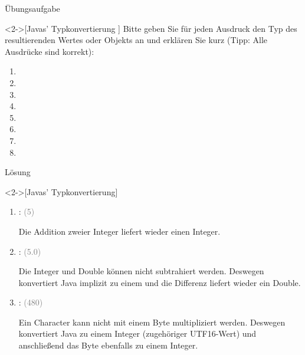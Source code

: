 \begin{frame}[c]{Übungsaufgabe}
    \begin{exercise}<2->[Javas' Typkonvertierung ]
        \pause{}\pause{}Bitte geben Sie für jeden Ausdruck den Typ des resultierenden Wertes oder Objekts an und erklären Sie kurz\pause{} (Tipp: Alle Ausdrücke sind korrekt):\pause
\begin{multicols}{2}
    \begin{enumerate}
        \item {}
        \item {}
        \item {}
        \item {}
        \item {}
        \item {}
        \item {}
        \item {}
    \end{enumerate}
\end{multicols}
    \end{exercise}
\end{frame}

\begin{frame}[c]{Lösung}
    \begin{solve}<2->[Javas' Typkonvertierung]
\pause\begin{enumerate}[<+(1)->]
    \widei
    \item {}:  \textcolor{gray}{(5)}\pause\par Die Addition zweier Integer liefert wieder einen Integer.
    \item {}:  \textcolor{gray}{(5.0)}\pause\par Die Integer und Double können nicht subtrahiert werden. Deswegen konvertiert Java  implizit zu einem  und die Differenz liefert wieder ein Double.
    \item {}:  \textcolor{gray}{(480)}\pause\par
    Ein Character kann nicht mit einem Byte multipliziert werden. Deswegen konvertiert Java  zu einem Integer (zugehöriger UTF16-Wert) und anschließend das Byte ebenfalls zu einem Integer.
\end{enumerate}
    \end{solve}
\end{frame}

